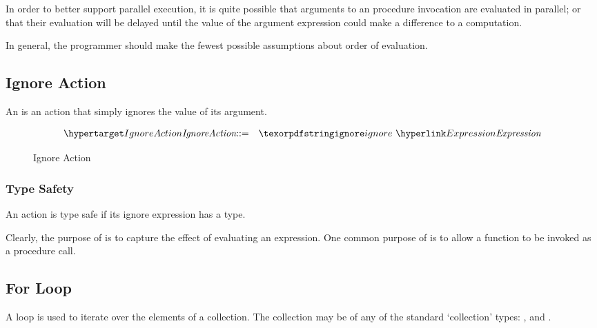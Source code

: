 \begin{aside}
In order to better support parallel execution, it is quite possible that arguments to an procedure invocation are evaluated in parallel; or that their evaluation will be delayed until the value of the argument expression could make a difference to a computation.
\end{aside}

\begin{aside}
In general, the programmer should make the fewest possible assumptions about order of evaluation.
\end{aside}

\subsection{Ignore Action}
\label{ignore}
An  is an action that simply ignores the value of its  argument.

\begin{figure}[htbp]
\begin{eqnarray*}
\ntDef{IgnoreAction}&\arrow&\q{ignore}\ \ntRef{Expression}
\end{eqnarray*}
\caption{Ignore Action}\label{ignoreActionFig}
\end{figure}

\subsubsection{Type Safety}
An  action is type safe if its ignore expression has a type.

\begin{prooftree}
\end{prooftree}

\begin{aside}
Clearly, the purpose of  is to capture the effect of evaluating an expression. One common purpose of  is to allow a function to be invoked as a procedure call.
\end{aside}

\subsection{For Loop}
\label{forLoop}
A  loop is used to iterate over the elements of a collection. The collection may be of any of the standard `collection' types:  ,  and .

